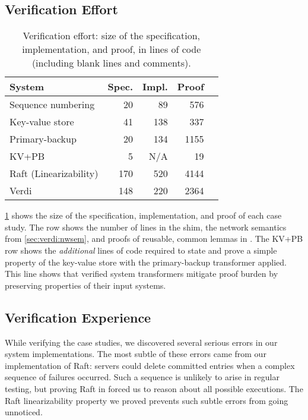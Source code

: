 \subsection{Verification Effort}
\begin{table}[t]
  \centering
  \caption{Verification effort:  size of the specification, implementation,
    and proof, in lines of code (including blank lines and comments).}\vspace{6pt}
\label{tab:effort}
  \begin{tabular}{lrrrr}
\toprule
\textbf{System}        & \textbf{Spec.} & \textbf{Impl.} & \textbf{Proof}\\\midrule
Sequence numbering     &  20            & 89             & 576       \\
Key-value store        &  41            & 138            & 337       \\
Primary-backup         &  20            & 134            & 1155      \\
KV+PB                  &  5             & N/A            & 19        \\
Raft (Linearizability) &  170           & 520            & 4144      \\
Verdi                  &  148           & 220            & 2364      \\
\bottomrule
  \end{tabular}
\end{table}

\cref{tab:effort} shows the size of the
specification, implementation, and proof of each case study.
The \Verdi row shows
the number of lines in the shim,
the network semantics from \cref{sec:verdi:nwsem},
and proofs of reusable, common lemmas in \Verdi. The KV+PB row shows
the \textit{additional} lines of code required to state and prove a
simple property of the key-value store with the primary-backup
transformer applied. This line shows that verified system transformers
mitigate proof burden by preserving properties of their input systems.

\subsection{Verification Experience}

While verifying the case studies, we discovered several serious errors in
our system implementations.  The most subtle of these errors came from our
implementation of Raft: servers could delete committed entries when a
complex sequence of failures occurred. Such a sequence is unlikely to arise
in regular testing, but proving Raft in \Verdi forced us to reason about
all possible executions. The Raft linearizability property we proved
prevents such subtle errors from going unnoticed.

